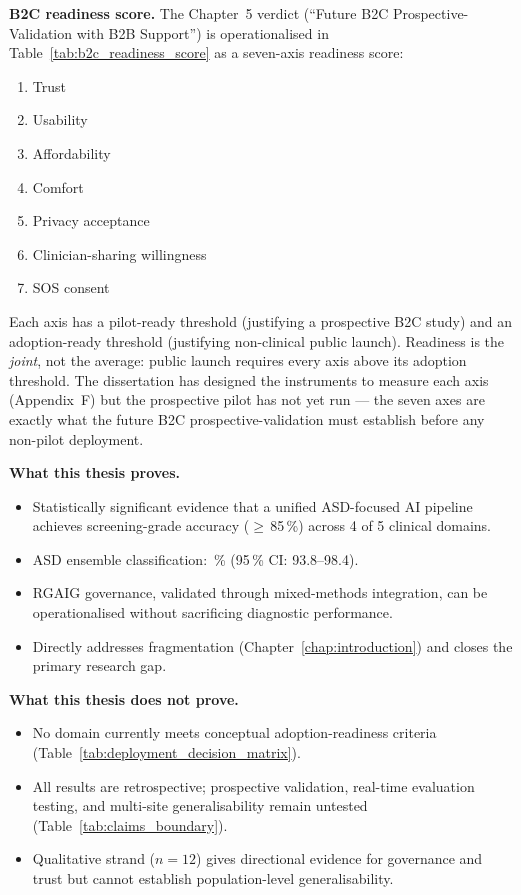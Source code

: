 

\noindent\textbf{B2C readiness score.} The Chapter~5 verdict (``Future B2C Prospective-Validation with B2B Support'') is operationalised in Table~\ref{tab:b2c_readiness_score} as a seven-axis readiness score:
\begin{enumerate}[leftmargin=*, itemsep=1pt, label=\arabic*.]
    \item Trust
    \item Usability
    \item Affordability
    \item Comfort
    \item Privacy acceptance
    \item Clinician-sharing willingness
    \item SOS consent
\end{enumerate}
\noindent Each axis has a pilot-ready threshold (justifying a prospective B2C study) and an adoption-ready threshold (justifying non-clinical public launch). Readiness is the \emph{joint}, not the average: public launch requires every axis above its adoption threshold. The dissertation has designed the instruments to measure each axis (Appendix~F) but the prospective pilot has not yet run --- the seven axes are exactly what the future B2C prospective-validation must establish before any non-pilot deployment.





\noindent\textbf{What this thesis proves.}
\begin{itemize}[leftmargin=*, itemsep=2pt]
    \item Statistically significant evidence that a unified ASD-focused AI pipeline achieves screening-grade accuracy ($\geq$\,85\,\%) across 4 of 5 clinical domains.
    \item ASD ensemble classification: \mscaval\,\% (95\,\% CI: 93.8--98.4).
    \item RGAIG governance, validated through mixed-methods integration, can be operationalised without sacrificing diagnostic performance.
    \item Directly addresses fragmentation (Chapter~\ref{chap:introduction}) and closes the primary research gap.
\end{itemize}

\noindent\textbf{What this thesis does not prove.}
\begin{itemize}[leftmargin=*, itemsep=2pt]
    \item No domain currently meets conceptual adoption-readiness criteria (Table~\ref{tab:deployment_decision_matrix}).
    \item All results are retrospective; prospective validation, real-time evaluation testing, and multi-site generalisability remain untested (Table~\ref{tab:claims_boundary}).
    \item Qualitative strand ($n = 12$) gives directional evidence for governance and trust but cannot establish population-level generalisability.
\end{itemize}

